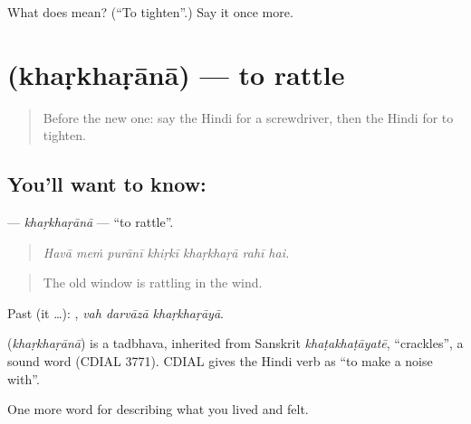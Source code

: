 \begin{tcolorbox}[breakable,colback=teal!4,colframe=teal!35!black,title={Before you move on}]
What does  mean? (\textquotedblleft{}To tighten\textquotedblright{}.) Say it once more.
\end{tcolorbox}
\section[\texorpdfstring{\hi{खड़खड़ाना} (khaṛkhaṛānā)}{खड़खड़ाना (khaṛkhaṛānā)}]{ (khaṛkhaṛānā) — to rattle}

\label{lesson:HI-C515-kharkharana}



\begin{quote}
Before the new one: say the Hindi for a screwdriver, then the Hindi for to tighten.
\end{quote}

\subsection*{You'll want to know: }
\textbf{} — \emph{khaṛkhaṛānā} — \textquotedblleft{}to rattle\textquotedblright{}.

\begin{quote}
      
\end{quote}

\begin{quote}
\emph{Havā meṁ purānī khiṛkī khaṛkhaṛā rahī hai.}
\end{quote}

\begin{quote}
The old window is rattling in the wind.
\end{quote}

Past (it …):   , \emph{vah darvāzā khaṛkhaṛāyā}.

\begin{cousinweb}
\textbf{} (\emph{khaṛkhaṛānā}) is a tadbhava, inherited from Sanskrit \emph{khaṭakhaṭāyatē}, \textquotedblleft{}crackles\textquotedblright{}, a sound word (CDIAL 3771). CDIAL gives the Hindi verb as \textquotedblleft{}to make a noise with\textquotedblright{}.
\end{cousinweb}

\begin{grammarlens}[title={What you've built}]
One more word for describing what you lived and felt.
\end{grammarlens}

